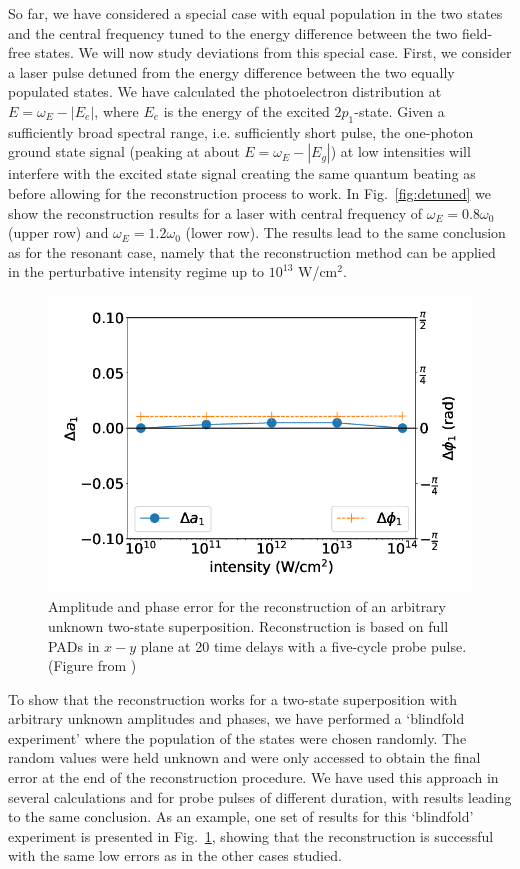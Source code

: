 So far, we have considered a special case with equal population in the two states and the central frequency tuned to the energy difference between the two field-free states. We will now study deviations from this special case. First, we consider a laser pulse detuned from the energy difference between the two equally populated states. We have calculated the photoelectron distribution at $E=\omega_E-|E_e|$, where $E_e$ is the energy of the excited $2p_1$-state. Given a sufficiently broad spectral range, i.e. sufficiently short pulse, the one-photon ground state signal (peaking at about $E = \omega_E-|E_g|$) at low intensities will interfere with the excited state signal creating the same quantum beating as before allowing for the reconstruction process to work. In Fig.~\ref{fig:detuned} we show the reconstruction results for a laser with central frequency of $\omega_E = 0.8\omega_0$ (upper row) and $\omega_E = 1.2\omega_0$ (lower row). 
The results lead to the same conclusion as for the resonant case, namely that the reconstruction method can be applied in the perturbative intensity regime up to $10^{13}$ W/cm$^2$.

\begin{figure}[!ht]
\centering
\includegraphics[width=0.5\linewidth]{figs/Photo_ionization/superpositions/Venzke_new_fig_7.png}
\caption{
Amplitude and phase error for the reconstruction of an arbitrary unknown two-state superposition. Reconstruction is based on full PADs in $x-y$ plane at 20 time delays with a five-cycle probe pulse. (Figure from \cite{venzke2021_wave})
} 
  \label{fig:random_state}
\end{figure}

To show that the reconstruction works for a two-state superposition with arbitrary unknown amplitudes and phases, we have performed a `blindfold experiment' where the population of the states were chosen randomly. The random values were held unknown and were only accessed to obtain the final error at the end of the reconstruction procedure. We have used this approach in several calculations and for probe pulses of different duration, with results
leading to the same conclusion. As an example, one set of results for this `blindfold' experiment is presented in Fig.~\ref{fig:random_state}, showing that the reconstruction is successful with the same low errors as in the other cases studied.

